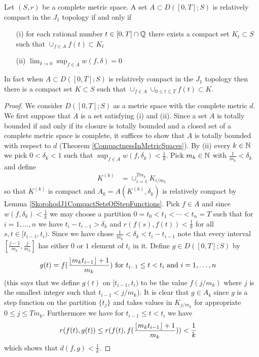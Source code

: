 \begin{thm}\label{ArzelaAscoliTheoremJ1Topology}Let $(S,r)$ be a complete metric space.  A set $A \subset D([0,T]; S)$ is relatively compact in the $J_1$ topology if and only if 
\begin{itemize}
\item[(i)]for each rational number
$t \in [0,T] \cap \mathbb{Q}$ there exists a compact set $K_t \subset S$ such that $\cup_{f \in A} f(t) \subset K_t$
\item[(ii)]$\lim_{\delta \to 0} \sup_{f \in A} w(f, \delta) = 0$
\end{itemize}
In fact when $A \subset D([0,T]; S)$ is relatively compact in the $J_1$ topology then there is a compact set $K \subset S$ such that $\cup_{f \in A} \cup_{0 \leq t \leq T} f(t) \subset K$.
\end{thm}
\begin{proof}
We consider $D([0,T];S)$ as a metric space with the complete metric $d$.  We first suppose that $A$ is a set satisfying (i) and (ii).
Since a set $A$ is totally bounded if and only if 
its closure is totally bounded and a closed set of  a complete metric space is complete, it suffices to
show that $A$ is totally bounded with respect to $d$ (Theorem \ref{CompactnessInMetricSpaces}).  By (ii) every $k \in \mathbb{N}$ we
pick $0 < \delta_k < 1$ such that $\sup_{f \in A} w(f, \delta_k) < \frac{1}{k}$.  Pick $m_k \in \mathbb{N}$ with $\frac{1}{m_k} < \delta_k$ and 
define 
\begin{align*}
K^{(k)}  &= \cup_{i=1}^{T m_k} K_{i/m_k}
\end{align*}
so that $K^{(k)}$ is compact and $A_k = A(K^{(k)}, \delta_k)$ is relatively compact by Lemma \ref{SkorohodJ1CompactSetsOfStepFunctions}.
Pick $f \in A$ and since $w(f,\delta_k) < \frac{1}{k}$ we may choose a partition $0=t_0 < t_1 < \dotsb < t_n=T$ such that  for $i=1, \dotsc, n$ we have 
$t_i-t_{i-1} > \delta_k$ and $r(f(s), f(t)) < \frac{1}{k}$ for all $s,t \in [t_{i-1}, t_i)$.  Since we have chose $\frac{1}{m_k} < \delta_k < t_i - t_{i-1}$ note that every
interval $[\frac{j-1}{m_k}, \frac{j}{m_k}]$ has either $0$ or $1$ element of $t_i$ in it.  Define $g \in D([0,T]; S)$ by
\begin{align*}
g(t) &= f(\frac{\lfloor m_k t_{i-1} \rfloor + 1}{m_k}) \text{ for $t_{i-1} \leq t < t_i$ and $i=1, \dotsc, n$}
\end{align*}
(this says that we define $g(t)$ on $[t_{i-1}, t_i)$ to be the value $f(j/m_k)$ where $j$ is the smallest integer such that $t_{i-1} < j/m_k$).
It is clear that $g \in A_k$ since $g$ is a step function on the partition $\lbrace t_j \rbrace$ and takes values in $K_{j/m_k}$ for appropriate $0 \leq j \leq T m_k$.
Furthermore we have for $t_{i-1} \leq t < t_i$ we have
\begin{align*}
r(f(t), g(t)) &\leq r(f(t), f(\frac{\lfloor m_k t_{i-1} \rfloor + 1}{m_k})) < \frac{1}{k}
\end{align*}
which shows that $d(f,g) < \frac{1}{k}$.  


\end{proof}
